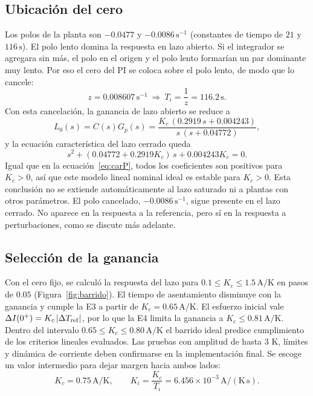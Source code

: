 \documentclass[journal,twocolumn]{IEEEtran}
\begin{document}
\subsection{Ubicación del cero}
Los polos de la planta son $-0.0477$ y $-0.0086\,\mathrm{s^{-1}}$ (constantes de tiempo de $21$ y $116\,\mathrm s$). El polo lento domina la respuesta en lazo abierto. Si el integrador se agregara sin más, el polo en el origen y el polo lento formarían un par dominante muy lento. Por eso el cero del PI se coloca sobre el polo lento, de modo que lo cancele:
\begin{equation}
z=0.008607\,\mathrm{s^{-1}}\ \Rightarrow\ T_i=\frac{1}{z}=116.2\,\mathrm s.\label{eq:cero}
\end{equation}
Con esta cancelación, la ganancia de lazo abierto se reduce a
\begin{equation}
L_0(s)=C(s)G_p(s)=\frac{K_c\,(0.2919\,s+0.004243)}{s\,(s+0.04772)},\label{eq:L}
\end{equation}
y la ecuación característica del lazo cerrado queda
\begin{equation}
s^2+(0.04772+0.2919K_c)\,s+0.004243K_c=0.\label{eq:carPI}
\end{equation}
Igual que en la ecuación~\eqref{eq:carP}, todos los coeficientes son positivos para $K_c>0$, así que este modelo lineal nominal ideal es estable para $K_c>0$. Esta conclusión no se extiende automáticamente al lazo saturado ni a plantas con otros parámetros. El polo cancelado, $-0.0086\,\mathrm{s^{-1}}$, sigue presente en el lazo cerrado. No aparece en la respuesta a la referencia, pero sí en la respuesta a perturbaciones, como se discute más adelante.

\subsection{Selección de la ganancia}
Con el cero fijo, se calculó la respuesta del lazo para $0.1\le K_c\le1.5\,\mathrm{A/K}$ en pasos de $0.05$ (Figura~\ref{fig:barrido}). El tiempo de asentamiento disminuye con la ganancia y cumple la E3 a partir de $K_c=0.65\,\mathrm{A/K}$. El esfuerzo inicial vale $\Delta I(0^+)=K_c\,|\Delta T_{\rm ref}|$, por lo que la E4 limita la ganancia a $K_c\le0.81\,\mathrm{A/K}$. Dentro del intervalo $0.65\le K_c\le0.80\,\mathrm{A/K}$ el barrido ideal predice cumplimiento de los criterios lineales evaluados. Las pruebas con amplitud de hasta 3 K, límites y dinámica de corriente deben confirmarse en la implementación final. Se escoge un valor intermedio para dejar margen hacia ambos lados:
\begin{equation}
K_c=0.75\,\mathrm{A/K},\qquad K_i=\frac{K_c}{T_i}=6.456\times10^{-3}\,\mathrm{A/(K\,s)}.\label{eq:ganancias}
\end{equation}
\end{document}
